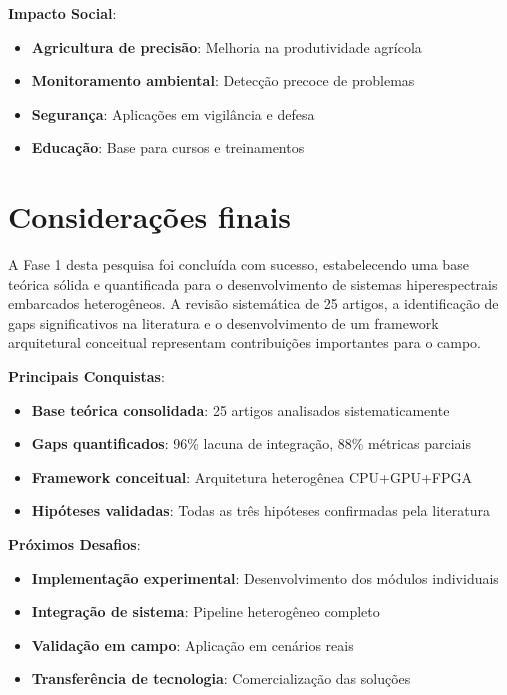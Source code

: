 \textbf{Impacto Social}:
\begin{itemize}
    \item \textbf{Agricultura de precisão}: Melhoria na produtividade agrícola
    \item \textbf{Monitoramento ambiental}: Detecção precoce de problemas
    \item \textbf{Segurança}: Aplicações em vigilância e defesa
    \item \textbf{Educação}: Base para cursos e treinamentos
\end{itemize}

\section{Considerações finais}\label{sec:consideracoes_finais}

A Fase 1 desta pesquisa foi concluída com sucesso, estabelecendo uma base teórica sólida e quantificada para o desenvolvimento de sistemas hiperespectrais embarcados heterogêneos. A revisão sistemática de 25 artigos, a identificação de gaps significativos na literatura e o desenvolvimento de um framework arquitetural conceitual representam contribuições importantes para o campo.

\textbf{Principais Conquistas}:
\begin{itemize}
    \item \textbf{Base teórica consolidada}: 25 artigos analisados sistematicamente
    \item \textbf{Gaps quantificados}: 96\% lacuna de integração, 88\% métricas parciais
    \item \textbf{Framework conceitual}: Arquitetura heterogênea CPU+GPU+FPGA
    \item \textbf{Hipóteses validadas}: Todas as três hipóteses confirmadas pela literatura
\end{itemize}

\textbf{Próximos Desafios}:
\begin{itemize}
    \item \textbf{Implementação experimental}: Desenvolvimento dos módulos individuais
    \item \textbf{Integração de sistema}: Pipeline heterogêneo completo
    \item \textbf{Validação em campo}: Aplicação em cenários reais
    \item \textbf{Transferência de tecnologia}: Comercialização das soluções
\end{itemize}

